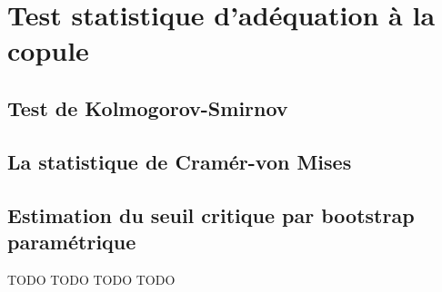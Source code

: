 \section{Test statistique d'adéquation à la copule}

\subsection{Test de Kolmogorov-Smirnov}

\subsection{La statistique de Cramér-von Mises}

\subsection{Estimation du seuil critique par bootstrap paramétrique}





TODO   TODO   TODO   TODO



